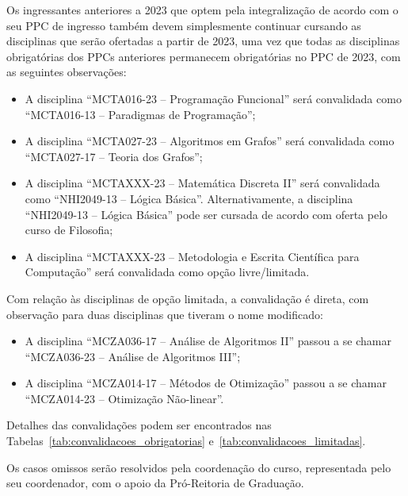 Os ingressantes anteriores a 2023 que optem pela integralização de acordo com o
seu PPC de ingresso também devem simplesmente continuar cursando as disciplinas
que serão ofertadas a partir de 2023, uma vez que todas as disciplinas
obrigatórias dos PPCs anteriores permanecem obrigatórias no PPC de 2023, com as
seguintes observações:
\begin{itemize}
    \item A disciplina ``MCTA016-23 -- Programação Funcional'' será convalidada
    como ``MCTA016-13 -- Paradigmas de Programação'';
    \item A disciplina ``MCTA027-23 -- Algoritmos em Grafos'' será convalidada
    como ``MCTA027-17 -- Teoria dos Grafos'';
    \item A disciplina ``MCTAXXX-23 -- Matemática Discreta II'' será
    convalidada como ``NHI2049-13 -- Lógica Básica''.  Alternativamente, a
    disciplina ``NHI2049-13 -- Lógica Básica'' pode ser cursada de acordo com
    oferta pelo curso de Filosofia;
    \item A disciplina ``MCTAXXX-23 -- Metodologia e Escrita Científica para
    Computação'' será convalidada como opção livre/limitada.
\end{itemize}
Com relação às disciplinas de opção limitada, a convalidação é direta, com
observação para duas disciplinas que tiveram o nome modificado:
\begin{itemize}
    \item A disciplina ``MCZA036-17 -- Análise de Algoritmos II'' passou a se
    chamar ``MCZA036-23 -- Análise de Algoritmos III'';
    \item A disciplina ``MCZA014-17 -- Métodos de Otimização'' passou a se
    chamar ``MCZA014-23 -- Otimização Não-linear''.
\end{itemize}

Detalhes das convalidações podem ser encontrados nas
Tabelas~\ref{tab:convalidacoes_obrigatorias}
e~\ref{tab:convalidacoes_limitadas}.

Os casos omissos serão resolvidos pela coordenação do curso, representada pelo
seu coordenador, com o apoio da Pró-Reitoria de Graduação.

